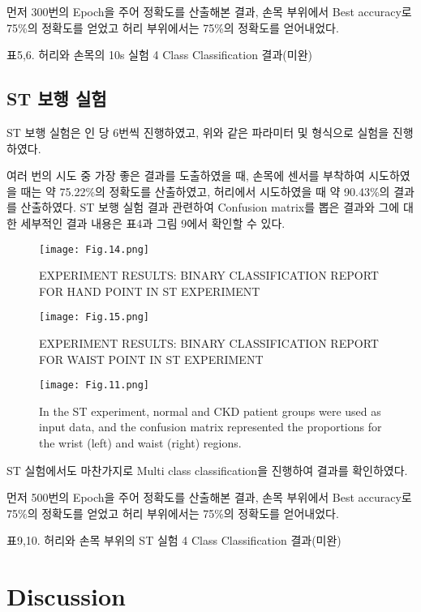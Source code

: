 \documentclass{article}
\begin{document}
먼저 300번의 Epoch을 주어 정확도를 산출해본 결과, 손목 부위에서 Best
accuracy로 75\%의 정확도를 얻었고 허리 부위에서는 75\%의 정확도를
얻어내었다.

표5,6. 허리와 손목의 10s 실험 4 Class Classification 결과(미완)

\subsection{ST 보행 실험}

ST 보행 실험은 인 당 6번씩 진행하였고, 위와 같은 파라미터 및 형식으로
실험을 진행하였다.

여러 번의 시도 중 가장 좋은 결과를 도출하였을 때, 손목에 센서를 부착하여
시도하였을 때는 약 75.22\%의 정확도를 산출하였고, 허리에서 시도하였을 때
약 90.43\%의 결과를 산출하였다. ST 보행 실험 결과 관련하여 Confusion
matrix를 뽑은 결과와 그에 대한 세부적인 결과 내용은 표4과 그림 9에서
확인할 수 있다.

\begin{figure}
\centering
\texttt{[image: Fig.14.png]}
\caption{\label{TABLE 3:}EXPERIMENT RESULTS: BINARY CLASSIFICATION REPORT FOR HAND POINT IN ST EXPERIMENT}
\end{figure}

\begin{figure}
\centering
\texttt{[image: Fig.15.png]}
\caption{\label{TABLE 4:}EXPERIMENT RESULTS: BINARY CLASSIFICATION REPORT FOR WAIST POINT IN ST EXPERIMENT}
\end{figure}

\begin{figure}
\centering
\texttt{[image: Fig.11.png]}
\caption{\label{Figure.11:}In the ST experiment, normal and CKD patient groups were used as input data, and the confusion matrix represented the proportions for the wrist (left) and waist (right) regions.}
\end{figure}

ST 실험에서도 마찬가지로 Multi class classification을 진행하여 결과를
확인하였다.

먼저 500번의 Epoch을 주어 정확도를 산출해본 결과, 손목 부위에서 Best
accuracy로 75\%의 정확도를 얻었고 허리 부위에서는 75\%의 정확도를
얻어내었다.

표9,10. 허리와 손목 부위의 ST 실험 4 Class Classification 결과(미완)

\section{Discussion}
\end{document}
